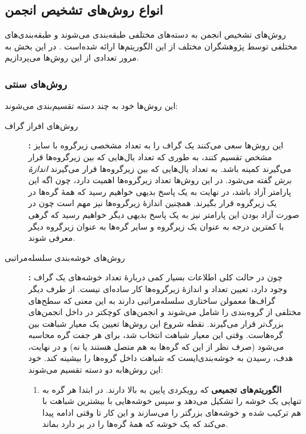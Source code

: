 \subsection{انواع روش‌های تشخیص انجمن}
روش‌های تشخیص انجمن به دسته‌های مختلفی طبقه‌بندی می‌شوند و طبقه‌بندی‌های مختلفی توسط پژوهشگران مختلف از این الگوریتم‌ها ارائه شده‌است \cite{porter2009communities} \cite{fortunato2010community} \cite{yang2010discovering}. در این بخش به مرور تعدادی از این روش‌ها می‌پردازیم.

\subsubsection{روش‌های سنتی}
این روش‌ها خود به چند دسته تقسیم‌بندی می‌شوند:
\begin{description}
  \item[روش‌های افراز گراف]\textbf{:}
  این روش‌ها سعی می‌کنند یک گراف را به تعداد مشخصی زیرگروه با سایز مشخص تقسیم کنند، به طوری که تعداد یال‌هایی که بین زیرگروه‌ها قرار می‌گیرند کمینه باشد. به تعداد یال‌هایی که بین زیرگروه‌ها قرار می‌گیرند \textit{اندازهٔ برش} گفته می‌شود. در این روش‌ها تعداد زیرگروه‌ها اهمیت دارد، چون اگه این پارامتر آزاد باشد، در نهایت به یک پاسخ بدیهی خواهیم رسید که همهٔ گره‌ها در یک زیرگروه قرار بگیرند. همچنین اندازهٔ زیرگروه‌ها نیز مهم است چون در صورت آزاد بودن این پارامتر نیز به یک پاسخ بدیهی دیگر خواهیم رسید که گرهی با کمترین درجه به عنوان یک زیرگروه و سایر گره‌ها به عنوان زیرگروه دیگر معرفی شوند.
  \item[روش‌های خوشه‌بندی سلسله‌مراتبی]\textbf{:}
  چون در حالت کلی اطلاعات بسیار کمی دربارهٔ تعداد خوشه‌های یک گراف وجود دارد، تعیین تعداد و اندازهٔ زیرگروه‌ها کار ساده‌ای نیست. از طرف دیگر گراف‌ها معمولن ساختاری سلسله‌مراتبی دارند به این معنی که سطح‌های مختلفی از گروه‌بندی را شامل می‌شوند و انجمن‌های کوچکتر در داخل انجمن‌های بزرگ‌تر قرار می‌گیرند. نقطه شروع این روش‌ها تعیین یک معیار شباهت بین گره‌هاست. وقتی این معیار شباهت انتخاب شد، برای هر جفت گره محاسبه می‌شود (صرف نظر از این که گره‌ها به هم متصل هستند یا نه)  و در نهایت، هدف، رسیدن به خوشه‌بندی‌ایست که شباهت داخل گروه‌ها را بیشینه کند. خود این روش‌هابه دو دسته تقسیم می‌شوند:
  \begin{enumerate}
    \item \textbf{الگوریتم‌های تجمیعی}
    که رویکردی پایین به بالا دارند. در ابتدا هر گره به تنهایی یک خوشه را تشکیل می‌دهد و سپس خوشه‌هایی با بیشترین شباهت با هم ترکیب شده و خوشه‌های بزرگتر را می‌سازند و این کار تا وقتی ادامه پیدا می‌کند که یک خوشه که همهٔ گره‌ها را در بر دارد بماند.

\end{enumerate}
\end{description}
